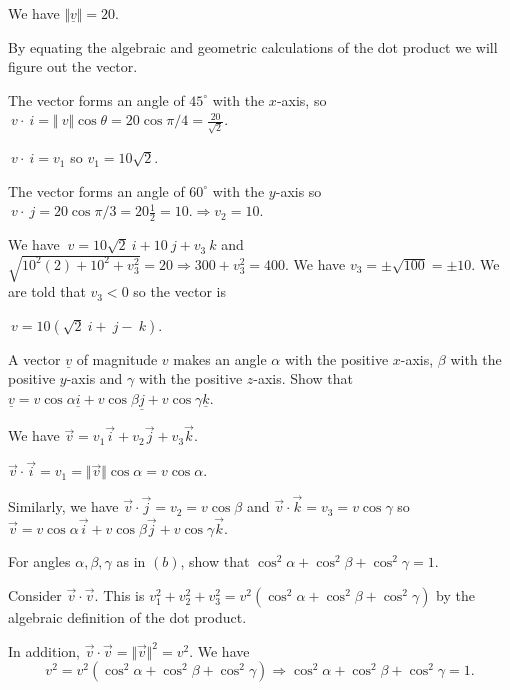 \documentclass[12pt,letterpaper]{exam}
\newcommand{\mb}[1]{\underline{#1}}
\begin{document}
\begin{questions}
\begin{parts}
\begin{solution}
We have $\Vert \mb v \Vert = 20$.  

By equating the algebraic and geometric calculations of the dot product we will figure out the vector.

The vector forms an angle of $45^\circ$ with the $x$-axis, so $\ v \cdot \ i = \Vert \ v \Vert \cos \theta = 20 \cos \pi/4 = \frac{20}{\sqrt{2}}$.

$\ v \cdot \ i = v_1$ so $v_1 = 10\sqrt{2}$.

The vector forms an angle of $60^\circ$ with the $y$-axis so $\ v\cdot \ j = 20 \cos \pi/3 = 20\frac{1}{2} = 10.  \Rightarrow v_2 = 10.$

We have $\ v = 10\sqrt{2}\ i + 10\ j + v_3 \ k$ and $\sqrt{10^2(2) + 10^2 + v_3^2} = 20 \Rightarrow 300 + v_3^2 = 400$.  We have $v_3 = \pm \sqrt{100} = \pm 10$.  We are told that $v_3 < 0$ so the vector is

$\ v = 10(\sqrt{2}\ i + \ j - \ k)$.  

\end{solution}

\item A vector $\mb{v}$ of magnitude $v$ makes an angle $\alpha$ with the positive $x$-axis, $\beta$ with the positive $y$-axis and $\gamma$ with the positive $z$-axis.  Show that $\mb{v} = v\cos\alpha \mb{i} + v\cos\beta\mb{j} + v\cos\gamma\mb{k}$.  

\begin{solution}
We have $\vec v = v_1 \vec i + v_2 \vec j + v_3\vec k$.  

$\vec v \cdot \vec i = v_1 = \Vert \vec v \Vert \cos\alpha = v\cos\alpha$.

Similarly, we have $\vec v \cdot \vec j = v_2 = v\cos\beta$ and $\vec v \cdot \vec k = v_3 = v\cos\gamma$ so
$\vec v = v\cos\alpha \vec i + v\cos\beta \vec j + v\cos\gamma\vec k$.
\end{solution}


\item For angles $\alpha, \beta, \gamma$ as in $(b)$, show that $\cos^2\alpha+\cos^2\beta+\cos^2\gamma = 1$.

\begin{solution}
Consider $\vec v\cdot \vec v$.  This is $v_1^2+v_2^2+v_3^2 = v^2(\cos^2\alpha+\cos^2\beta+\cos^2\gamma)$ by the algebraic definition of the dot product.

In addition, $\vec v \cdot \vec v = \Vert \vec v \Vert^2 = v^2$.  We have \[v^2 = v^2(\cos^2\alpha+\cos^2\beta+\cos^2\gamma) \Rightarrow \cos^2\alpha+\cos^2\beta+\cos^2\gamma = 1.\]
\end{solution}



\end{parts}
\end{questions}
\end{document}
